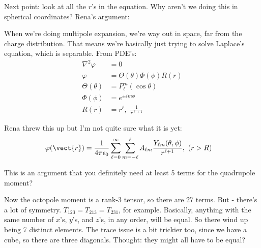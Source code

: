 \documentclass[letterpaper]{article}
\begin{document}
Next point: look at all the $r$'s in the equation. Why aren't we doing this in spherical coordinates? Rena's argument:

When we're doing multipole expansion, we're way out in space, far from the charge distribution. That means we're basically just trying to solve Laplace's equation, which is separable.
From PDE's:
\begin{equation*}
\begin{aligned}
	\nabla^2\varphi &= 0 \\
	\varphi &= \Theta(\theta)\Phi(\phi)R(r) \\
	\Theta(\theta) &= P_\ell^m(\cos\theta) \\
	\Phi(\phi) &= e^{\pm im\phi} \\
	R(r) &= r^\ell,\,\,\frac{1}{r^{\ell+1}}
\end{aligned}
\end{equation*}

Rena threw this up but I'm not quite sure what it is yet:
\begin{equation*}
\begin{aligned}
	\varphi (\vect{r}) &= \frac{1}{4\pi\epsilon_0}\sum_{\ell=0}^\infty \sum_{m =-\ell}^\ell A_{\ell m}\frac{Y_{\ell m}(\theta,\phi)}{r^{\ell+1}},\,\,(r>R)
\end{aligned}
\end{equation*}

This is an argument that you definitely need at least 5 terms for the quadrupole moment?

Now the octopole moment is a rank-3 tensor, so there are 27 terms. But - there's a lot of symmetry. $T_{123} = T_{213} = T_{231}$, for example. Basically, anything with the same number of $x$'s, $y$'s, and $z$'s, in any order, will be equal. So there wind up being 7 distinct elements. The trace issue is a bit trickier too, since we have a cube, so there are three diagonals. Thought: they might all have to be equal?
	
\end{document}
